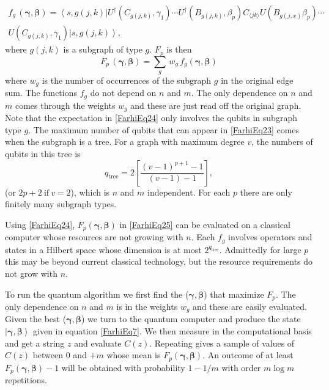 \documentclass[t11pt,reprint,preprint,preprintnumbers]{revtex4}
\newcommand{\bra}[1]{\left\langle #1 \right|}
\newcommand{\ket}[1]{\left|#1\right\rangle}
\begin{document}
\begin{multline}
f_g\, (\boldsymbol{\gamma}, \boldsymbol{\beta}) = \bra{s, g (j, k)} U^\dagger(C_{g (j,k)}, \gamma_1) \cdots U^\dagger (B_{g (j, k)}, \beta_p)C_{\langle j k\rangle} U(B_{g(j,x)}\beta_p) \cdots\\ U(C_{g (j, k)}, \gamma_1) \ket{s, g (j, k)},
\label{FarhiEq24}
\end{multline}
where $g (j,k)$ is a subgraph of type $g$. $F_p$ is then
\begin{equation}
F_p \, (\boldsymbol{\gamma}, \boldsymbol{\beta}) = \sum\limits_g \, w_g\, f_g (\boldsymbol{\gamma}, \boldsymbol{\beta})
\label{FarhiEq25}
\end{equation}
where $w_g$ is the number of occurrences of the subgraph $g$ in the original edge sum.  The functions $f_g$ do not depend on $n$ and $m$.  The only dependence on $n$ and $m$ comes through the weights $w_g$ and these are just read off the original graph.   Note that the expectation in \eqref{FarhiEq24} only involves the qubits in subgraph type $g$.  The maximum number of qubits that can appear in \eqref{FarhiEq23} comes when the subgraph is a tree.  For a graph with maximum degree $v$, the numbers of qubits in this tree is
\begin{equation}
q_{\text{tree}} = 2 \left[ \frac{(v-1)^{p+1} -1}{(v-1) -1}\right],
\label{FarhiEq26}
\end{equation}
(or $2p + 2 \ \text{if}\ v=2$), which is $n$ and $m$ independent. For each $p$ there are only finitely many subgraph types.

Using \eqref{FarhiEq24}, $F_p(\boldsymbol{\gamma}, \boldsymbol{\beta})$ in \eqref{FarhiEq25} can be evaluated on a classical computer whose  resources are not growing with $n$.  Each $f_g$ involves operators and states in a Hilbert space whose dimension is at most $2^{q_{\text{tree}}}$.  Admittedly for large $p$ this may be beyond current classical technology, but the resource requirements do not grow with $n$. 

To run the quantum algorithm we  first find the ($\boldsymbol{\gamma},\boldsymbol{\beta}$) that maximize $F_p$.  The only dependence on $n$ and $m$ is in the weights $w_g$ and these are easily evaluated.  Given the best ($\boldsymbol{\gamma}, \boldsymbol{\beta}$) we turn to the quantum computer and produce the state $\ket{\boldsymbol{\gamma}, \boldsymbol{\beta}}$  given in equation \eqref{FarhiEq7}.   We then measure in the computational basis and get a string $z$ and evaluate $C(z)$.  Repeating gives a sample of values of $C(z)$ between $0$ and $+m$ whose mean is $F_p (\boldsymbol{\gamma}, \boldsymbol{\beta})$. An outcome of at least $F_p (\boldsymbol{\gamma}, \boldsymbol{\beta}) - 1$ will be obtained with probability $1-1/m$ with order $m \log m$ repetitions.  
\end{document}
